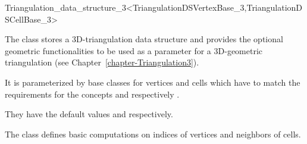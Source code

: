 

\begin{ccRefClass}{Triangulation_data_structure_3<TriangulationDSVertexBase_3,TriangulationDSCellBase_3>}

\ccDefinition
The class  stores a 3D-triangulation data
structure and provides the optional
geometric functionalities to be used as a parameter for a 
3D-geometric triangulation (see Chapter~\ref{chapter-Triangulation3}). 


\ccParameters
It is parameterized by base classes for vertices and cells which have to match
the requirements for the concepts  and
 respectively
.

They have the default values  and
 respectively.

\ccIsModel {}


The class  defines basic computations on
indices of vertices and neighbors of cells. 

\ccSeeAlso

\\



\end{ccRefClass}
